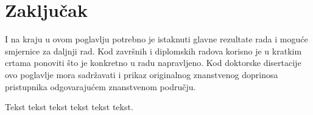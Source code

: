 \chapter{Zaklju\v{c}ak}
I na kraju u ovom poglavlju potrebno je istaknuti glavne rezultate
rada i mogu\'{c}e smjernice za daljnji rad. Kod završnih i diplomskih radova
korisno je u kratkim crtama ponoviti što je konkretno u radu napravljeno. Kod
doktorske disertacije ovo poglavlje mora sadr\v{z}avati i prikaz originalnog
znanstvenog doprinosa pristupnika odgovaraju\'{c}em znanstvenom podru\v{c}ju. 

Tekst tekst tekst tekst tekst tekst. 
